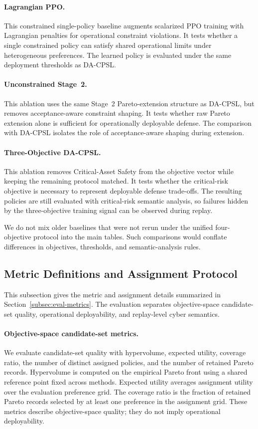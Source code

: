 \documentclass[sigconf,review,anonymous]{acmart}
\begin{document}
\paragraph{Lagrangian PPO.}
This constrained single-policy baseline augments scalarized PPO training
with Lagrangian penalties for operational constraint violations. It tests
whether a single constrained policy can satisfy shared operational
limits under heterogeneous preferences. The learned policy is evaluated
under the same deployment thresholds as DA-CPSL.

\paragraph{Unconstrained Stage~2.}
This ablation uses the same Stage~2 Pareto-extension structure as
DA-CPSL, but removes acceptance-aware constraint shaping. It tests
whether raw Pareto extension alone is sufficient for operationally
deployable defense. The comparison with DA-CPSL isolates the role of
acceptance-aware shaping during extension.

\paragraph{Three-Objective DA-CPSL.}
This ablation removes Critical-Asset Safety from the objective vector
while keeping the remaining protocol matched. It tests whether the
critical-risk objective is necessary to represent deployable defense
trade-offs. The resulting policies are still evaluated with critical-risk
semantic analysis, so failures hidden by the three-objective training
signal can be observed during replay.

We do not mix older baselines that were not rerun under the unified
four-objective protocol into the main tables. Such comparisons would
conflate differences in objectives, thresholds, and semantic-analysis
rules.

\subsection{Metric Definitions and Assignment Protocol}
\label{app:metric-details}

This subsection gives the metric and assignment details summarized in
Section~\ref{subsec:eval-metrics}. The evaluation separates
objective-space candidate-set quality, operational deployability, and
replay-level cyber semantics.

\paragraph{Objective-space candidate-set metrics.}
We evaluate candidate-set quality with hypervolume, expected utility,
coverage ratio, the number of distinct assigned policies, and the number
of retained Pareto records. Hypervolume is computed on the empirical
Pareto front using a shared reference point fixed across methods.
Expected utility averages assignment utility over the evaluation
preference grid. The coverage ratio is the fraction of retained Pareto
records selected by at least one preference in the assignment grid.
These metrics describe objective-space quality; they do not imply
operational deployability.
\end{document}
